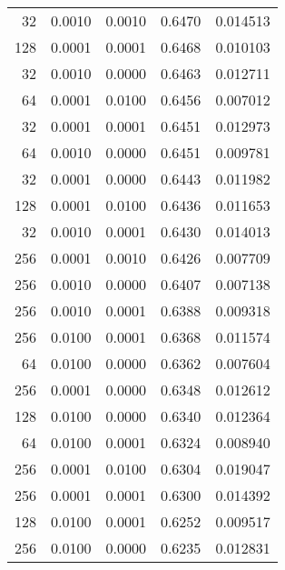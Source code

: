 \begin{tabular}{rrrrr}
  32 &  0.0010 &  0.0010 &  0.6470 &  0.014513 \\
 128 &  0.0001 &  0.0001 &  0.6468 &  0.010103 \\
  32 &  0.0010 &  0.0000 &  0.6463 &  0.012711 \\
  64 &  0.0001 &  0.0100 &  0.6456 &  0.007012 \\
  32 &  0.0001 &  0.0001 &  0.6451 &  0.012973 \\
  64 &  0.0010 &  0.0000 &  0.6451 &  0.009781 \\
  32 &  0.0001 &  0.0000 &  0.6443 &  0.011982 \\
 128 &  0.0001 &  0.0100 &  0.6436 &  0.011653 \\
  32 &  0.0010 &  0.0001 &  0.6430 &  0.014013 \\
 256 &  0.0001 &  0.0010 &  0.6426 &  0.007709 \\
 256 &  0.0010 &  0.0000 &  0.6407 &  0.007138 \\
 256 &  0.0010 &  0.0001 &  0.6388 &  0.009318 \\
 256 &  0.0100 &  0.0001 &  0.6368 &  0.011574 \\
  64 &  0.0100 &  0.0000 &  0.6362 &  0.007604 \\
 256 &  0.0001 &  0.0000 &  0.6348 &  0.012612 \\
 128 &  0.0100 &  0.0000 &  0.6340 &  0.012364 \\
  64 &  0.0100 &  0.0001 &  0.6324 &  0.008940 \\
 256 &  0.0001 &  0.0100 &  0.6304 &  0.019047 \\
 256 &  0.0001 &  0.0001 &  0.6300 &  0.014392 \\
 128 &  0.0100 &  0.0001 &  0.6252 &  0.009517 \\
 256 &  0.0100 &  0.0000 &  0.6235 &  0.012831 \\
\bottomrule
\end{tabular}
